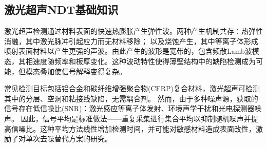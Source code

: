\subsection{激光超声NDT基础知识}
\label{sec:lu-fundamentals}

激光超声检测通过材料表面的快速热膨胀产生弹性波。两种产生机制共存：热弹性消融，其中激光脉冲引起应力而无材料移除；
以及烧蚀产生，其中等离子体形成喷射表面材料以产生更强的声波\cite{liu2022deep}。由此产生的波形是宽带的，包含频散Lamb波模态，其相速度随频率和板厚变化。这种波动特性使得薄壁结构中的缺陷检测成为可能，但模态叠加使信号解释变得复杂\cite{zhang2020deep}。

常见检测目标包括铝合金和碳纤维增强聚合物(CFRP)复合材料，激光超声可检测其中的分层、空洞和粘接线缺陷，无需耦合剂。
然而，由于多种噪声源，获取的信号存在低信噪比(SNR)：激光感应等离子体发射、环境声学干扰和光电探测器噪声。
因此，信号平均是标准做法——重复采集进行集合平均以抑制随机噪声并提高信噪比\cite{liu2022deep}。这种平均方法线性增加检测时间，并可能对敏感材料造成表面改性，激励了对单次去噪替代方案的研究。
